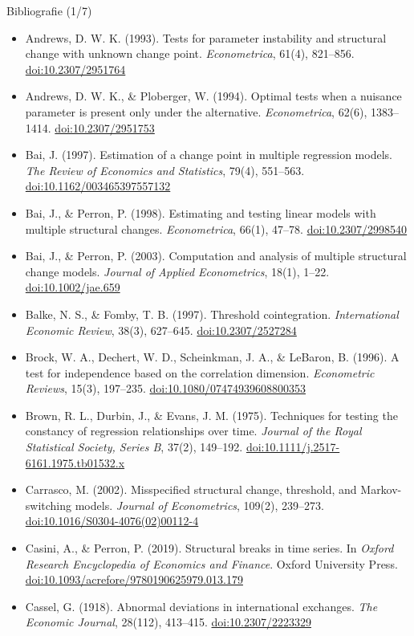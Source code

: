 \begin{frame}{Bibliografie (1/7)}
\itemsize{\tiny}
\begin{itemize}
    \item Andrews, D. W. K. (1993). Tests for parameter instability and structural change with unknown change point. \textit{Econometrica}, 61(4), 821--856. \href{https://doi.org/10.2307/2951764}{doi:10.2307/2951764}
    \item Andrews, D. W. K., \& Ploberger, W. (1994). Optimal tests when a nuisance parameter is present only under the alternative. \textit{Econometrica}, 62(6), 1383--1414. \href{https://doi.org/10.2307/2951753}{doi:10.2307/2951753}
    \item Bai, J. (1997). Estimation of a change point in multiple regression models. \textit{The Review of Economics and Statistics}, 79(4), 551--563. \href{https://doi.org/10.1162/003465397557132}{doi:10.1162/003465397557132}
    \item Bai, J., \& Perron, P. (1998). Estimating and testing linear models with multiple structural changes. \textit{Econometrica}, 66(1), 47--78. \href{https://doi.org/10.2307/2998540}{doi:10.2307/2998540}
    \item Bai, J., \& Perron, P. (2003). Computation and analysis of multiple structural change models. \textit{Journal of Applied Econometrics}, 18(1), 1--22. \href{https://doi.org/10.1002/jae.659}{doi:10.1002/jae.659}
    \item Balke, N. S., \& Fomby, T. B. (1997). Threshold cointegration. \textit{International Economic Review}, 38(3), 627--645. \href{https://doi.org/10.2307/2527284}{doi:10.2307/2527284}
    \item Brock, W. A., Dechert, W. D., Scheinkman, J. A., \& LeBaron, B. (1996). A test for independence based on the correlation dimension. \textit{Econometric Reviews}, 15(3), 197--235. \href{https://doi.org/10.1080/07474939608800353}{doi:10.1080/07474939608800353}
    \item Brown, R. L., Durbin, J., \& Evans, J. M. (1975). Techniques for testing the constancy of regression relationships over time. \textit{Journal of the Royal Statistical Society, Series B}, 37(2), 149--192. \href{https://doi.org/10.1111/j.2517-6161.1975.tb01532.x}{doi:10.1111/j.2517-6161.1975.tb01532.x}
    \item Carrasco, M. (2002). Misspecified structural change, threshold, and Markov-switching models. \textit{Journal of Econometrics}, 109(2), 239--273. \href{https://doi.org/10.1016/S0304-4076(02)00112-4}{doi:10.1016/S0304-4076(02)00112-4}
    \item Casini, A., \& Perron, P. (2019). Structural breaks in time series. In \textit{Oxford Research Encyclopedia of Economics and Finance}. Oxford University Press. \href{https://doi.org/10.1093/acrefore/9780190625979.013.179}{doi:10.1093/acrefore/9780190625979.013.179}
    \item Cassel, G. (1918). Abnormal deviations in international exchanges. \textit{The Economic Journal}, 28(112), 413--415. \href{https://doi.org/10.2307/2223329}{doi:10.2307/2223329}
\end{itemize}
\end{frame}

